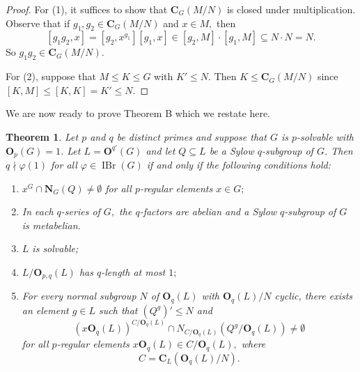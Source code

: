 \documentclass[12pt]{amsart}
\newtheorem{theorem}{Theorem}[section]
\theoremstyle{remark}
\numberwithin{equation}{section}
\begin{document}
\begin{proof}
For (1), it suffices to show that ${\mathbf{C}}_G(M/N)$ is closed under multiplication. Observe that if $g_1,g_2\in {\mathbf{C}}_G(M/N)$ and $x\in M,$ then \[[g_1g_2,x]=[g_2,x^{g_1}][g_1,x]\in [g_2,M]\cdot [g_1,M]\subseteq N\cdot N=N.\] So $g_1g_2\in {\mathbf{C}}_G(M/N).$

For (2), suppose that  $M\leq K\le G$ with $K'\le N.$ Then $K\leq {\mathbf{C}}_G(M/N)$ since $[K,M]\le [K,K]=K'\le N.$
\end{proof}

We are now ready to prove Theorem B which we restate here.

\begin{theorem}\label{th:characterization}
Let $p$ and $q$ be distinct primes and suppose that $G$ is $p$-solvable with ${\mathbf{O}}_p(G)=1$. Let $L={\mathbf{O}}^{q'}(G)$ and let $Q\subseteq L$ be a  Sylow $q$-subgroup of $G$. Then $q\nmid\varphi(1)$ for all $\varphi\in\operatorname{IBr}(G)$ if and only if the following conditions hold:
\begin{enumerate}[$(1)$]
\item $x^G\cap {\mathbf{N}}_G(Q)\neq\emptyset$ for all $p$-regular elements $x\in G;$
\item In each $q$-series of $G,$ the $q$-factors are abelian and a Sylow $q$-subgroup of $G$ is metabelian.
\item $L$ is solvable;
\item $L/{\mathbf{O}}_{p,q}(L)$ has $q$-length at most $1;$
\item For every normal subgroup $N$ of ${\mathbf{O}}_q(L)$ with ${\mathbf{O}}_q(L)/N$ cyclic, there exists an element $g\in L$ such that $(Q^g)'\leq N$ and $$(x {\mathbf{O}}_q (L))^{C/{\mathbf{O}}_q(L)} \cap N_{C/{\mathbf{O}}_q (L)} (Q^g/{\mathbf{O}}_q (L)) \neq \emptyset$$ for all $p$-regular elements $x {\mathbf{O}}_q (L) \in C/{\mathbf{O}}_q (L),$ where $$C = {\mathbf{C}}_L ({\mathbf{O}}_q (L)/N).$$
\end{enumerate}
\end{theorem}
\end{document}
